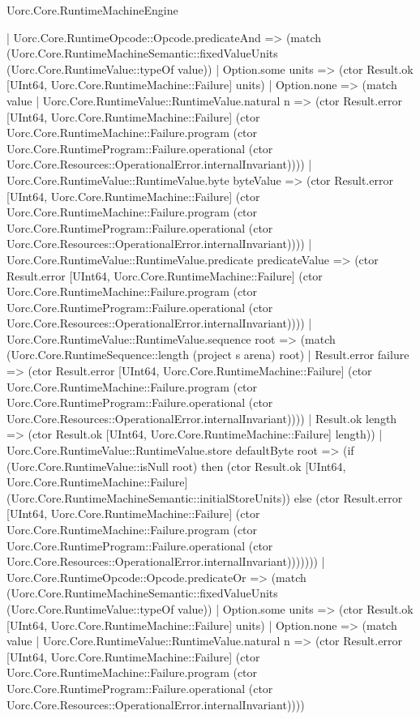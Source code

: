 \begin{lexlean}{Uorc.Core.RuntimeMachineEngine}
\begin{semanticmodule}
{          | Uorc.Core.RuntimeOpcode::Opcode.predicateAnd => (match (Uorc.Core.RuntimeMachineSemantic::fixedValueUnits (Uorc.Core.RuntimeValue::typeOf value))
            | Option.some units => (ctor Result.ok [UInt64, Uorc.Core.RuntimeMachine::Failure] units)
            | Option.none => (match value
              | Uorc.Core.RuntimeValue::RuntimeValue.natural n => (ctor Result.error [UInt64, Uorc.Core.RuntimeMachine::Failure] (ctor Uorc.Core.RuntimeMachine::Failure.program (ctor Uorc.Core.RuntimeProgram::Failure.operational (ctor Uorc.Core.Resources::OperationalError.internalInvariant))))
              | Uorc.Core.RuntimeValue::RuntimeValue.byte byteValue => (ctor Result.error [UInt64, Uorc.Core.RuntimeMachine::Failure] (ctor Uorc.Core.RuntimeMachine::Failure.program (ctor Uorc.Core.RuntimeProgram::Failure.operational (ctor Uorc.Core.Resources::OperationalError.internalInvariant))))
              | Uorc.Core.RuntimeValue::RuntimeValue.predicate predicateValue => (ctor Result.error [UInt64, Uorc.Core.RuntimeMachine::Failure] (ctor Uorc.Core.RuntimeMachine::Failure.program (ctor Uorc.Core.RuntimeProgram::Failure.operational (ctor Uorc.Core.Resources::OperationalError.internalInvariant))))
              | Uorc.Core.RuntimeValue::RuntimeValue.sequence root => (match (Uorc.Core.RuntimeSequence::length (project s arena) root)
                | Result.error failure => (ctor Result.error [UInt64, Uorc.Core.RuntimeMachine::Failure] (ctor Uorc.Core.RuntimeMachine::Failure.program (ctor Uorc.Core.RuntimeProgram::Failure.operational (ctor Uorc.Core.Resources::OperationalError.internalInvariant))))
                | Result.ok length => (ctor Result.ok [UInt64, Uorc.Core.RuntimeMachine::Failure] length))
              | Uorc.Core.RuntimeValue::RuntimeValue.store defaultByte root => (if (Uorc.Core.RuntimeValue::isNull root) then (ctor Result.ok [UInt64, Uorc.Core.RuntimeMachine::Failure] (Uorc.Core.RuntimeMachineSemantic::initialStoreUnits)) else (ctor Result.error [UInt64, Uorc.Core.RuntimeMachine::Failure] (ctor Uorc.Core.RuntimeMachine::Failure.program (ctor Uorc.Core.RuntimeProgram::Failure.operational (ctor Uorc.Core.Resources::OperationalError.internalInvariant)))))))
          | Uorc.Core.RuntimeOpcode::Opcode.predicateOr => (match (Uorc.Core.RuntimeMachineSemantic::fixedValueUnits (Uorc.Core.RuntimeValue::typeOf value))
            | Option.some units => (ctor Result.ok [UInt64, Uorc.Core.RuntimeMachine::Failure] units)
            | Option.none => (match value
              | Uorc.Core.RuntimeValue::RuntimeValue.natural n => (ctor Result.error [UInt64, Uorc.Core.RuntimeMachine::Failure] (ctor Uorc.Core.RuntimeMachine::Failure.program (ctor Uorc.Core.RuntimeProgram::Failure.operational (ctor Uorc.Core.Resources::OperationalError.internalInvariant))))
}
\end{semanticmodule}
\end{lexlean}
